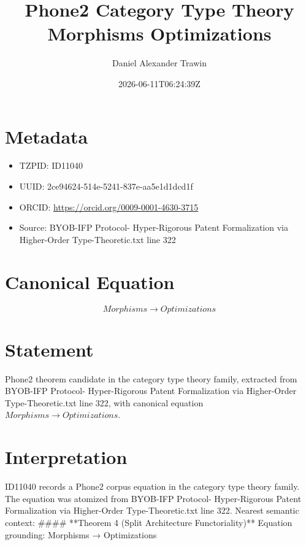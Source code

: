 \documentclass[11pt]{article}
\title{Phone2 Category Type Theory Morphisms Optimizations}
\author{Daniel Alexander Trawin}
\date{2026-06-11T06:24:39Z}
\begin{document}
\maketitle
\section*{Metadata}
\begin{itemize}
\item TZPID: ID11040
\item UUID: 2ce94624-514e-5241-837e-aa5e1d1dcd1f
\item ORCID: \url{https://orcid.org/0009-0001-4630-3715}
\item Source: BYOB-IFP Protocol- Hyper-Rigorous Patent Formalization via Higher-Order Type-Theoretic.txt line 322
\end{itemize}
\section*{Canonical Equation}
\[
Morphisms → {Optimizations}
\]
\section*{Statement}
Phone2 theorem candidate in the category type theory family, extracted from BYOB-IFP Protocol- Hyper-Rigorous Patent Formalization via Higher-Order Type-Theoretic.txt line 322, with canonical equation $Morphisms → {Optimizations}$.
\section*{Interpretation}
ID11040 records a Phone2 corpus equation in the category type theory family. The equation was atomized from BYOB-IFP Protocol- Hyper-Rigorous Patent Formalization via Higher-Order Type-Theoretic.txt line 322. Nearest semantic context: #### **Theorem 4 (Split Architecture Functoriality)** Equation grounding: Morphisms → {Optimizations}
\end{document}
